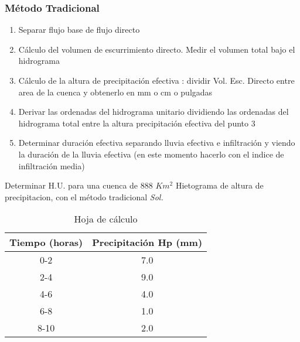 \subsubsection{Método Tradicional}
\begin{enumerate}
    \item Separar flujo base de flujo directo
    \item Cálculo del volumen de escurrimiento directo. Medir el volumen total bajo el hidrograma
    \item Cálculo de la altura de precipitación efectiva : dividir Vol. Esc. Directo entre area de la cuenca y obtenerlo en mm o cm o pulgadas
    \item Derivar las ordenadas del hidrograma unitario dividiendo las ordenadas del hidrograma total entre la altura precipitación efectiva del punto 3
    \item Determinar duración efectiva separando lluvia efectiva e infiltración y viendo la duración de la lluvia efectiva (en este momento hacerlo con el indice de infiltración media)
\end{enumerate}
\begin{example}
    Determinar H.U. para una cuenca de 888 $Km^2$ Hietograma de altura de precipitacion, con el método tradicional
\textit{ Sol. }
\begin{table}[h!]
    \centering
    \begin{tabular}{@{}cc@{}}
    \toprule
    Tiempo (horas) & Precipitación Hp (mm) \\ \midrule
    0-2            & 7.0                   \\
    2-4            & 9.0                   \\
    4-6            & 4.0                   \\
    6-8            & 1.0                   \\
    8-10           & 2.0                   \\ \bottomrule
    \end{tabular}
    \caption{Hoja de cálculo}
    \label{tabhs7}
\end{table}
\end{example}

